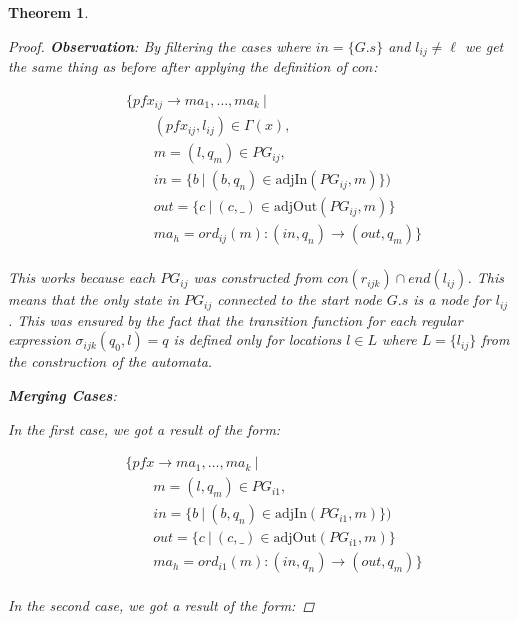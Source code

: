 \documentclass[twocolumn]{sig-alternate-10pt}
\newtheorem{thm}{Theorem}
\begin{document}
\begin{thm}
\begin{proof}
  \textbf{Observation}: 
  By filtering the cases where $in = \{ G.s \}$ and $l_{ij} \neq \ell$ we get the same thing as before after applying the definition of $con$:

 \[ \begin{array}{l}
     ~~~~~~~~~ \{ pfx_{ij} \rightarrow ma_1, \dots, ma_k ~\vert~ \\
     ~~~~~~~~~~~~~~~~~~ (pfx_{ij}, l_{ij}) \in \Gamma(x), \\
     ~~~~~~~~~~~~~~~~~~ m = (l,q_m) \in PG_{ij}, \\
     ~~~~~~~~~~~~~~~~~~ in = \{ b ~\vert~ (b,q_n) \in \text{adjIn}(PG_{ij},m) \}) \\
     ~~~~~~~~~~~~~~~~~~ out = \{ c ~\vert~ (c,\_) \in \text{adjOut}(PG_{ij},m) \} \\
     ~~~~~~~~~~~~~~~~~~ ma_h = ord_{ij}(m) : (in,q_n) \rightarrow (out,q_m) \} \\
  \end{array} \]%

  This works because each $PG_{ij}$ was constructed from $con(r_{ijk}) \cap end(l_{ij})$. This means that the only state in $PG_{ij}$ connected to the start node $G.s$ is a node for $l_{ij}$. This was ensured by the fact that the transition function for each regular expression $\sigma_{ijk}(q_0,l) = q$ is defined only for locations $l \in L$ where $L = \{ l_{ij} \}$ from the construction of the automata.

  \vspace{1em}
  \textbf{Merging Cases}:

  In the first case, we got a result of the form:

  \[ \begin{array}{l}
     ~~~~~~~~~ \{ pfx \rightarrow ma_1, \dots, ma_k ~\vert~ \\
     ~~~~~~~~~~~~~~~~~~ m = (l,q_m) \in PG_{i1}, \\
     ~~~~~~~~~~~~~~~~~~ in = \{ b ~\vert~ (b,q_n) \in \text{adjIn}(PG_{i1},m) \}) \\
     ~~~~~~~~~~~~~~~~~~ out = \{ c ~\vert~ (c,\_) \in \text{adjOut}(PG_{i1},m) \} \\
     ~~~~~~~~~~~~~~~~~~ ma_h = ord_{i1}(m) : (in,q_n) \rightarrow (out,q_m) \} \\
  \end{array} \]%

  In the second case, we got a result of the form:


\end{proof}
\end{thm}
\end{document}
